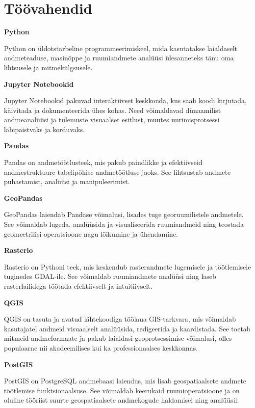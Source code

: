\section{Töövahendid}


\textbf{Python}

Python on üldotstarbeline programmeerimiskeel, mida kasutatakse
laialdaselt andmeteaduse, masinõppe ja ruumiandmete analüüsi ülesanneteks tänu
oma lihtsusele ja mitmekülgsusele.



\textbf{Jupyter Notebookid}\nopagebreak[4]

Jupyter Notebookid pakuvad interaktiivset keskkonda, kus
saab koodi kirjutada, käivitada ja dokumenteerida ühes kohas. Need võimaldavad
dünaamilist andmeanalüüsi ja tulemuste visuaalset esitlust, muutes
uurimisprotsessi läbipaistvaks ja korduvaks.



\textbf{Pandas}\nopagebreak[4]

Pandas on andmetöötlusteek, mis pakub paindlikke ja
efektiivseid andmestruktuure tabelipõhise andmetöötluse jaoks. See lihtsustab
andmete puhastamist, analüüsi ja manipuleerimist.



\textbf{GeoPandas}\nopagebreak[4]

GeoPandas laiendab Pandase võimalusi, lisades tuge georuumilistele
andmetele. See võimaldab lugeda, analüüsida ja visualiseerida
ruumiandmeid ning teostada geomeetrilisi operatsioone nagu lõikumine ja
ühendamine.


\textbf{Rasterio}\nopagebreak[4]

Rasterio on Pythoni teek, mis keskendub rasterandmete lugemisele
ja töötlemisele tuginedes GDAL-ile. See võimaldab ruumiandmete analüüsi
ning laseb rasterfailidega töötada efektiivselt ja intuitiivselt.

\textbf{QGIS}\nopagebreak[4]

QGIS on tasuta ja avatud lähtekoodiga töölaua GIS-tarkvara, mis võimaldab
kasutajatel andmeid visuaalselt analüüsida, redigeerida ja kaardistada. See
toetab mitmeid andmeformaate ja pakub laialdasi geoprotsessimise võimalusi,
olles populaarne nii akadeemilises kui ka professionaalses keskkonnas.


\textbf{PostGIS}\nopagebreak[4]

PostGIS on PostgreSQL andmebaasi laiendus, mis lisab geospatiaalsete
andmete töötlemise funktsionaalsuse. See võimaldab keerukaid ruumioperatsioone
ja on oluline tööriist suurte geospatiaalsete andmekogude haldamisel ning
analüüsil.



